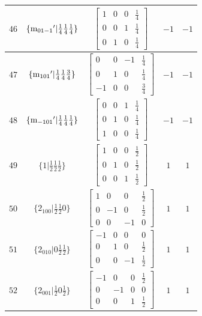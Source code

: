 \documentclass[fleqn,8pt]{jsarticle}
\begin{document}
\begin{longtable}{ccccc}
$ 46 $ & $ \{{\rm m}_{01-1}{}'|\frac{1}{4} \frac{1}{4} \frac{1}{4}\} $ & $ \begin{bmatrix} 1 & 0 & 0 & \frac{1}{4} \\ 0 & 0 & 1 & \frac{1}{4} \\ 0 & 1 & 0 & \frac{1}{4} \end{bmatrix} $ & $ -1 $ & $ -1 $ \\ \hline
$ 47 $ & $ \{{\rm m}_{101}{}'|\frac{1}{4} \frac{1}{4} \frac{3}{4}\} $ & $ \begin{bmatrix} 0 & 0 & -1 & \frac{1}{4} \\ 0 & 1 & 0 & \frac{1}{4} \\ -1 & 0 & 0 & \frac{3}{4} \end{bmatrix} $ & $ -1 $ & $ -1 $ \\ \hline
$ 48 $ & $ \{{\rm m}_{-101}{}'|\frac{1}{4} \frac{1}{4} \frac{1}{4}\} $ & $ \begin{bmatrix} 0 & 0 & 1 & \frac{1}{4} \\ 0 & 1 & 0 & \frac{1}{4} \\ 1 & 0 & 0 & \frac{1}{4} \end{bmatrix} $ & $ -1 $ & $ -1 $ \\ \hline
$ 49 $ & $ \{1|\frac{1}{2} \frac{1}{2} \frac{1}{2}\} $ & $ \begin{bmatrix} 1 & 0 & 0 & \frac{1}{2} \\ 0 & 1 & 0 & \frac{1}{2} \\ 0 & 0 & 1 & \frac{1}{2} \end{bmatrix} $ & $ 1 $ & $ 1 $ \\ \hline
$ 50 $ & $ \{2{}_{100}|\frac{1}{2} \frac{1}{2} 0\} $ & $ \begin{bmatrix} 1 & 0 & 0 & \frac{1}{2} \\ 0 & -1 & 0 & \frac{1}{2} \\ 0 & 0 & -1 & 0 \end{bmatrix} $ & $ 1 $ & $ 1 $ \\ \hline
$ 51 $ & $ \{2{}_{010}|0 \frac{1}{2} \frac{1}{2}\} $ & $ \begin{bmatrix} -1 & 0 & 0 & 0 \\ 0 & 1 & 0 & \frac{1}{2} \\ 0 & 0 & -1 & \frac{1}{2} \end{bmatrix} $ & $ 1 $ & $ 1 $ \\ \hline
$ 52 $ & $ \{2{}_{001}|\frac{1}{2} 0 \frac{1}{2}\} $ & $ \begin{bmatrix} -1 & 0 & 0 & \frac{1}{2} \\ 0 & -1 & 0 & 0 \\ 0 & 0 & 1 & \frac{1}{2} \end{bmatrix} $ & $ 1 $ & $ 1 $ \\ \hline

\end{longtable}
\end{document}
